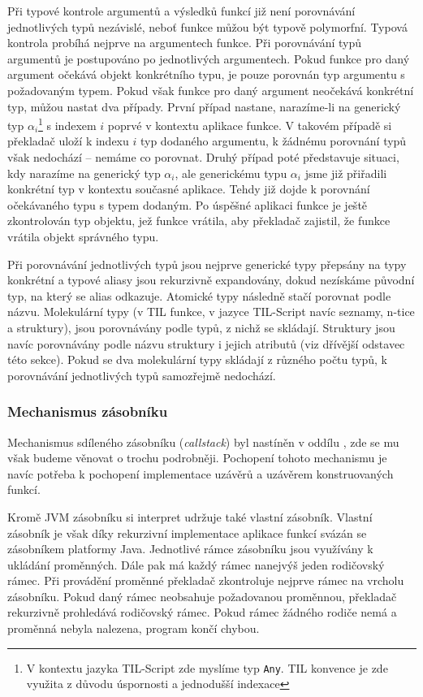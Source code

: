 Při typové kontrole argumentů a výsledků funkcí již není porovnávání jednotlivých typů nezávislé,
neboť funkce můžou být typově polymorfní. Typová kontrola probíhá nejprve na argumentech funkce.
Při porovnávání typů argumentů je postupováno po jednotlivých argumentech. Pokud funkce pro daný
argument očekává objekt konkrétního typu, je pouze porovnán typ argumentu s požadovaným typem.
Pokud však funkce pro daný argument neočekává konkrétní typ, můžou nastat dva případy. První případ
nastane, narazíme-li na generický typ $\alpha_{i}$\footnote{V kontextu jazyka TIL-Script zde myslíme typ
  \lstinline{Any}. TIL konvence je zde využita z důvodu úspornosti a jednodušší
  indexace} s indexem $i$ poprvé v kontextu aplikace funkce. V takovém případě si překladač uloží
k indexu $i$ typ dodaného argumentu, k žádnému porovnání typů však nedochází -- nemáme co porovnat.
Druhý případ poté představuje situaci, kdy narazíme na generický typ $\alpha_{i}$, ale generickému typu
$\alpha_{i}$ jsme již přiřadili konkrétní typ v kontextu současné aplikace. Tehdy již dojde k porovnání
očekávaného typu s typem dodaným. Po úspěšné aplikaci funkce je ještě zkontrolován typ objektu, jež
funkce vrátila, aby překladač zajistil, že funkce vrátila objekt správného typu.

Při porovnávání jednotlivých typů jsou nejprve generické typy přepsány na typy konkrétní a typové
aliasy jsou rekurzivně expandovány, dokud nezískáme původní typ, na který se alias odkazuje.
Atomické typy následně stačí porovnat podle názvu. Molekulární typy (v TIL funkce, v jazyce
TIL-Script navíc seznamy, n-tice a struktury), jsou porovnávány podle typů, z nichž se skládají.
Struktury jsou navíc porovnávány podle názvu struktury i jejich atributů (viz dřívější odstavec této
sekce). Pokud se dva molekulární typy skládají z různého počtu typů, k porovnávání jednotlivých typů
samozřejmě nedochází.

\subsubsection{Mechanismus zásobníku}

Mechanismus sdíleného zásobníku (\textit{callstack}) byl nastíněn v oddílu
, zde se mu však budeme věnovat o trochu podrobněji.
Pochopení tohoto mechanismu je navíc potřeba k pochopení implementace uzávěrů a uzávěrem
konstruovaných funkcí.

Kromě JVM zásobníku si interpret udržuje také vlastní zásobník. Vlastní zásobník je však díky
rekurzivní implementace aplikace funkcí svázán se zásobníkem platformy Java. Jednotlivé rámce
zásobníku jsou využívány k ukládání proměnných. Dále pak má každý rámec nanejvýš jeden rodičovský
rámec. Při provádění proměnné překladač zkontroluje nejprve rámec na vrcholu zásobníku. Pokud daný
rámec neobsahuje požadovanou proměnnou, překladač rekurzivně prohledává rodičovský
rámec. Pokud rámec žádného rodiče nemá a proměnná nebyla nalezena, program končí chybou.

